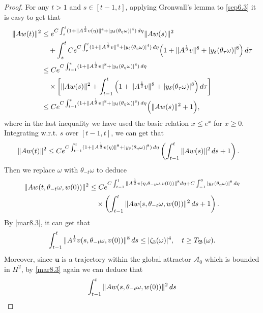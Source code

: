 \documentclass[10pt,a4paper]{amsart}
\renewcommand{\d}{{\rm{d}}}
\begin{document}
\begin{proof}
 For any $t >1$ and $s\in[t-1,t]$, applying Gronwall's lemma to \eqref{sep6.3}   it is easy to get that
\begin{align*}
\|Aw(t)\|^2&\leq e^{C\int_s^t( 1+\|A^\frac12 \textbf{v}(\eta)\|^4 +|y_\delta(\theta_\eta\omega)|^4)\, \d \eta}\|Aw(s)\|^2 \nonumber\\
&\quad +\int_s^t Ce^{C\int_\tau^t  (1+\|A^\frac12 \textbf{v}\|^4+|y_\delta(\theta_\eta\omega)|^4)\, \d \eta}
 \Big (1+\|A^\frac12 \textbf{v}\|^8  +|y_\delta(\theta_\tau\omega)|^8\Big ) \, \d \tau\nonumber\\
&\leq Ce^{C\int_{t-1}^t(1+\|A^\frac12 \textbf{v}\|^8 +|y_\delta(\theta_\eta\omega)|^8)\, \d \eta} \nonumber \\
&\quad \times \left [\|Aw(s)\|^2+\int_{t-1}^t
\left(1+\|A^\frac12 \textbf{v}\|^8  +|y_\delta(\theta_\tau\omega)|^8\right)\d \tau \right]\\
& \leq Ce^{C\int_{t-1}^t(1+\|A^\frac12 \textbf{v}\|^8 +|y_\delta(\theta_\eta\omega)|^8)\, \d \eta} \Big(\|Aw(s)\|^2+ 1 \Big)
, \nonumber
\end{align*}
where in the last inequality we have used the basic relation $x\leq e^x$ for $x\geq 0$.
Integrating w.r.t. $s$ over   $  [t-1,t] $, we can get that
 \begin{align*}
\|Aw(t)\|^2
&\leq Ce^{C\int_{t-1}^t  (1+\|A^\frac12 \textbf{v}(\eta)\|^8+|y_\delta(\theta_\eta\omega)|^8)\, \d \eta}
 \left (\int_{t-1}^t\|Aw(s)\|^2\, \d s + 1\right). \nonumber
\end{align*}
Then we replace $\omega$ with $\theta_{-t}\omega$ to deduce
\begin{align}\label{4.22}
\|Aw(t,\theta_{-t}\omega,w(0))\|^2
&\leq Ce^{C\int_{t-1}^t \|A^\frac12 \textbf{v}(\eta,\theta_{-t}\omega, \textbf{v}(0))\|^8 \d \eta + C\int^0_{-1} |y_\delta(\theta_{\eta}\omega) |^8
\, \d \eta}\nonumber\\
&\quad \times \left(\int_{t-1}^t\|Aw(s,\theta_{-t}\omega,w(0))\|^2\, \d s +1  \right) .
\end{align}
By \eqref{mar8.3}, it can get that
\begin{align} \label{4.23}
  \int_{t-1}^t  \|A^\frac12 \textbf{v}(s,\theta_{-t}\omega,\textbf{v}(0))\|^8\, \d s \leq  |\zeta_3(\omega)|^4   ,  \quad t\geq T_{\mathfrak B}(\omega).
\end{align}
Moreover, since $\textbf{u}$ is a trajectory within the global attractor $\mathcal A_0$ which is   bounded  in $H^2$,  by \eqref{mar8.3}  again we can deduce that
\begin{align}
\int_{t-1}^t\|Aw(s,\theta_{-t}\omega,w(0))\|^2\, \d s

\end{align}
\end{proof}
\end{document}
